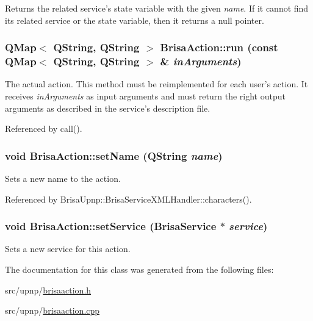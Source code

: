 Returns the related service's state variable with the given {\itshape name\/}. If it cannot find its related service or the state variable, then it returns a null pointer. \hypertarget{classBrisaUpnp_1_1BrisaAction_aca2fe8881b0abe570222f31856040424}{
\subsubsection[{run}]{\setlength{\rightskip}{0pt plus 5cm}QMap$<$ QString, QString $>$ BrisaAction::run (const QMap$<$ QString, QString $>$ \& {\em inArguments})}}
\label{classBrisaUpnp_1_1BrisaAction_aca2fe8881b0abe570222f31856040424}


The actual action. This method must be reimplemented for each user's action. It receives {\itshape inArguments\/} as input arguments and must return the right output arguments as described in the service's description file. 

Referenced by call().\hypertarget{classBrisaUpnp_1_1BrisaAction_a16390c4f715a0169bc9fd25ac2845e26}{
\subsubsection[{setName}]{\setlength{\rightskip}{0pt plus 5cm}void BrisaAction::setName (QString {\em name})}}
\label{classBrisaUpnp_1_1BrisaAction_a16390c4f715a0169bc9fd25ac2845e26}


Sets a new name to the action. 

Referenced by BrisaUpnp::BrisaServiceXMLHandler::characters().\hypertarget{classBrisaUpnp_1_1BrisaAction_a81b762ee7bd271a83ccc06f6755b84d8}{
\subsubsection[{setService}]{\setlength{\rightskip}{0pt plus 5cm}void BrisaAction::setService ({\bf BrisaService} $\ast$ {\em service})}}
\label{classBrisaUpnp_1_1BrisaAction_a81b762ee7bd271a83ccc06f6755b84d8}


Sets a new service for this action. 

The documentation for this class was generated from the following files:\begin{DoxyCompactItemize}
\item 
src/upnp/\hyperlink{brisaaction_8h}{brisaaction.h}\item 
src/upnp/\hyperlink{brisaaction_8cpp}{brisaaction.cpp}\end{DoxyCompactItemize}
